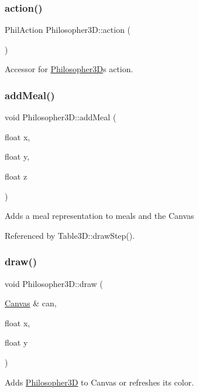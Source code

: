 \subsubsection{\texorpdfstring{action()}{action()}}
{\footnotesize\ttfamily Phil\+Action Philosopher3\+D\+::action (\begin{DoxyParamCaption}{ }\end{DoxyParamCaption})\hspace{0.3cm}{\ttfamily [inline]}}

Accessor for \hyperlink{class_philosopher3_d}{Philosopher3D}\textquotesingle{}s action. \mbox{\label{class_philosopher3_d_a536c633359c82402055c6264cc8f12cc}} 
\subsubsection{\texorpdfstring{add\+Meal()}{addMeal()}}
{\footnotesize\ttfamily void Philosopher3\+D\+::add\+Meal (\begin{DoxyParamCaption}\item[{float}]{x,  }\item[{float}]{y,  }\item[{float}]{z }\end{DoxyParamCaption})}

Adds a meal representation to meals and the Canvas 

Referenced by Table3\+D\+::draw\+Step().

\mbox{\label{class_philosopher3_d_af9321231d363ade9c90bf381650bebb7}} 
\subsubsection{\texorpdfstring{draw()}{draw()}}
{\footnotesize\ttfamily void Philosopher3\+D\+::draw (\begin{DoxyParamCaption}\item[{\hyperlink{classtsgl_1_1_canvas}{Canvas} \&}]{can,  }\item[{float}]{x,  }\item[{float}]{y }\end{DoxyParamCaption})}

Adds \hyperlink{class_philosopher3_d}{Philosopher3D} to Canvas or refreshes its color. 

